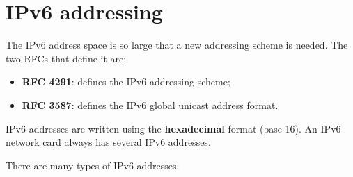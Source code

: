 
\section{IPv6 addressing}
The IPv6 address space is so large that a new addressing scheme is needed. The two RFCs that define it are:

\begin{itemize}
    \item \textbf{RFC 4291}: defines the IPv6 addressing scheme;
    \item \textbf{RFC 3587}: defines the IPv6 global unicast address format.
\end{itemize}

IPv6 addresses are written using the \textbf{hexadecimal} format (base 16). An IPv6 network card always has several IPv6 addresses.

There are many types of IPv6 addresses:

